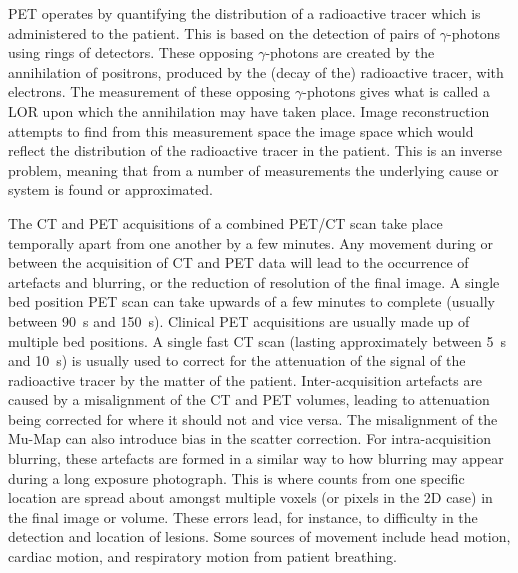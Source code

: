         \gls{PET} operates by quantifying the distribution of a radioactive tracer which is administered to the patient. This is based on the detection of pairs of $\gamma$-photons using rings of detectors. These opposing $\gamma$-photons are created by the annihilation of positrons, produced by the (decay of the) radioactive tracer, with electrons. The measurement of these opposing $\gamma$-photons gives what is called a \gls{LOR} upon which the annihilation may have taken place. Image reconstruction attempts to find from this measurement space the image space which would reflect the distribution of the radioactive tracer in the patient. This is an inverse problem, meaning that from a number of measurements the underlying cause or system is found or approximated.
            
        The \gls{CT} and \gls{PET} acquisitions of a combined \gls{PET}/\gls{CT} scan take place temporally apart from one another by a few minutes. Any movement during or between the acquisition of \gls{CT} and \gls{PET} data will lead to the occurrence of artefacts and blurring, or the reduction of resolution of the final image. A single bed position \gls{PET} scan can take upwards of a few minutes to complete (usually between \SI{90}{\second} and \SI{150}{\second}). Clinical \gls{PET} acquisitions are usually made up of multiple bed positions. A single fast \gls{CT} scan (lasting approximately between \SI{5}{\second} and \SI{10}{\second}) is usually used to correct for the attenuation of the signal of the radioactive tracer by the matter of the patient. Inter-acquisition artefacts are caused by a misalignment of the \gls{CT} and \gls{PET} volumes, leading to attenuation being corrected for where it should not and vice versa. The misalignment of the \gls{Mu-Map} can also introduce bias in the scatter correction. For intra-acquisition blurring, these artefacts are formed in a similar way to how blurring may appear during a long exposure photograph. This is where counts from one specific location are spread about amongst multiple voxels (or pixels in the \gls{2D} case) in the final image or volume. These errors lead, for instance, to difficulty in the detection and location of lesions. Some sources of movement include head motion, cardiac motion, and respiratory motion from patient breathing.
    
